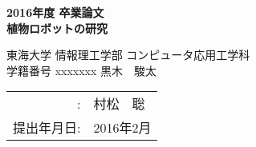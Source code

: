 
%
%

%

\begin{titlepage}
\vspace*{2cm}
\begin{center}
{\Large\bf 2016年度 卒業論文}\\
\vspace{1cm}
{\LARGE\bf 植物ロボットの研究}

\vspace{3cm}
{\Large 
東海大学 情報理工学部 コンピュータ応用工学科}\\

\vspace{1cm}
{\large
学籍番号 xxxxxxx \hspace{5mm} 黒木　駿太}\\


\vspace{1cm}
\begin{tabular}{rl}
\hspace{15mm}{\large 指導教員}
		:& {\large 村松　聡}
\\
\hspace{9mm}提出年月日:& 2016年2月\\
\end{tabular}
\end{center}
\end{titlepage}

\normalsize
\pagestyle{plain}

\tableofcontents
\listoffigures
\listoftables











